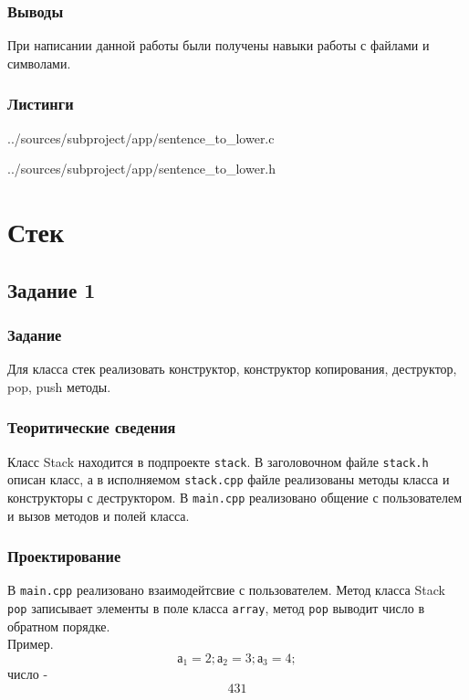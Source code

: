 \documentclass[12pt,a4paper]{report}
\begin{document}
\subsection{Выводы}
При написании данной работы были получены навыки работы с файлами и символами.
\subsection*{Листинги}


{../sources/subproject/app/sentence_to_lower.c}


{../sources/subproject/app/sentence_to_lower.h}
\chapter{Стек}
\section{Задание 1}
\subsection{Задание}
Для класса стек реализовать конструктор, конструктор копирования, деструктор, pop, push методы.
\subsection{Теоритические сведения}
Класс Stack находится в подпроекте \verb+stack+. В заголовочном файле \verb+stack.h+ описан класс, а в исполняемом \verb+stack.cpp+ файле реализованы методы класса и конструкторы с деструктором. В \verb+main.cpp+ реализовано общение с пользователем и вызов методов и полей класса.

\subsection{Проектирование}

В \verb+main.cpp+  реализовано взаимодейтсвие с пользователем. Метод класса Stack \verb+pop+ записывает элементы в поле класса \verb+array+, метод \verb+pop+ выводит число в обратном порядке.\\
Пример. \begin{equation}
а_1=2; а_2=3; а_3=4;
\end{equation} 
число - \begin{equation}431 \end{equation} 
\end{document}
